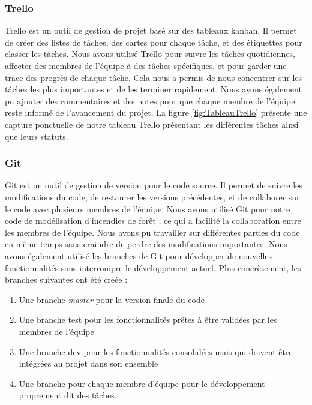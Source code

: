 
\subsubsection{Trello}

Trello est un outil de gestion de projet basé sur des tableaux kanban. Il permet de créer des listes de tâches, des cartes pour chaque tâche, et des étiquettes pour classer les tâches. Nous avons utilisé Trello pour suivre les tâches quotidiennes, affecter des membres de l'équipe à des tâches spécifiques, et pour garder une trace des progrès de chaque tâche. Cela nous a permis de nous concentrer sur les tâches les plus importantes et de les terminer rapidement. Nous avons également pu ajouter des commentaires et des notes pour que chaque membre de l'équipe reste informé de l'avancement du projet. La figure \ref{fig:TableauTrello} présente une capture ponctuelle de notre tableau Trello présentant les différentes tâches ainsi que leurs statuts.


\subsubsection{Git}

Git est un outil de gestion de version pour le code source. Il permet de suivre les modifications du code, de restaurer les versions précédentes, et de collaborer sur le code avec plusieurs membres de l'équipe. Nous avons utilisé Git pour notre code de modélisation d'incendies de forêt \parencite{gitrepo}, ce qui a facilité la collaboration entre les membres de l'équipe. Nous avons pu travailler sur différentes parties du code en même temps sans craindre de perdre des modifications importantes. Nous avons également utilisé les branches de Git pour développer de nouvelles fonctionnalités sans interrompre le développement actuel. Plus concrètement, les branches suivantes ont été créée :

\begin{enumerate}
    \item Une branche \textit{master} pour la version finale du code
    \item Une branche test pour les fonctionnalités prêtes à être validées par les membres de l’équipe
    \item Une branche dev pour les fonctionnalités consolidées mais qui doivent être intégrées au projet dans son ensemble
    \item Une branche pour chaque membre d’équipe pour le développement proprement dit des tâches.
\end{enumerate}

